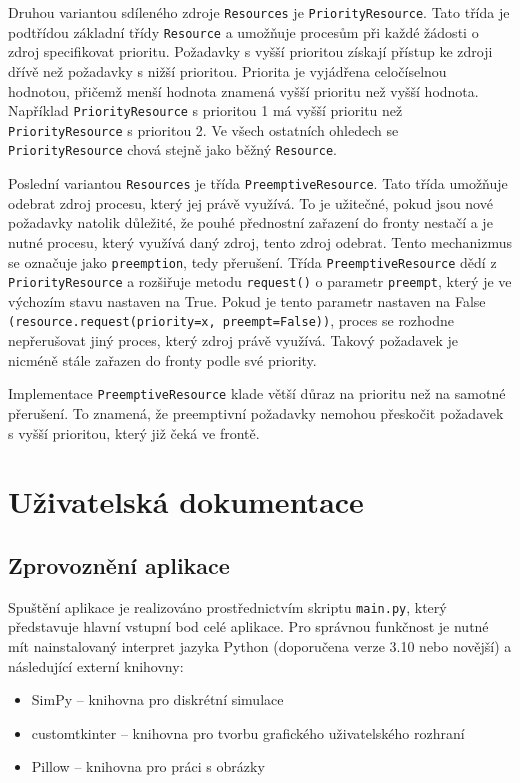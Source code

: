 \documentclass[12pt,a4paper]{article}
\begin{document}
Druhou variantou sdíleného zdroje \texttt{Resources} je \texttt{PriorityResource}. Tato třída je podtřídou základní třídy \texttt{Resource} a umožňuje procesům při každé žádosti o zdroj specifikovat prioritu. Požadavky s vyšší prioritou získají přístup ke zdroji dřívě než požadavky s nižší prioritou. Priorita je vyjádřena celočíselnou hodnotou, přičemž menší hodnota znamená vyšší prioritu než vyšší hodnota. Například \texttt{PriorityResource} s prioritou 1 má vyšší prioritu než \texttt{PriorityResource} s prioritou 2. Ve všech ostatních ohledech se \texttt{PriorityResource} chová stejně jako běžný \texttt{Resource}.

Poslední variantou \texttt{Resources} je třída \texttt{PreemptiveResource}. Tato třída umožňuje odebrat zdroj procesu, který jej právě využívá. To je užitečné, pokud jsou nové požadavky natolik důležité, že pouhé přednostní zařazení do fronty nestačí a je nutné procesu, který využívá daný zdroj, tento zdroj odebrat. Tento mechanizmus se označuje jako \texttt{preemption}, tedy přerušení. Třída \texttt{PreemptiveResource} dědí z \texttt{PriorityResource} a rozšiřuje metodu \texttt{request()} o parametr \texttt{preempt}, který je ve výchozím stavu nastaven na True. Pokud je tento parametr nastaven na False \texttt{(resource.request(priority=x, preempt=False))}, proces se rozhodne nepřerušovat jiný proces, který zdroj právě využívá. Takový požadavek je nicméně stále zařazen do fronty podle své priority.

Implementace \texttt{PreemptiveResource} klade větší důraz na prioritu než na samotné přerušení. To znamená, že preemptivní požadavky nemohou přeskočit požadavek s vyšší prioritou, který již čeká ve frontě. 

\section{Uživatelská dokumentace}
\subsection{Zprovoznění aplikace}

Spuštění aplikace je realizováno prostřednictvím skriptu \texttt{main.py}, který představuje hlavní vstupní bod celé aplikace. Pro správnou funkčnost je nutné mít nainstalovaný interpret jazyka Python (doporučena verze 3.10 nebo novější) a následující externí knihovny:

\begin{itemize}
    \item SimPy – knihovna pro diskrétní simulace
    \item customtkinter – knihovna pro tvorbu grafického uživatelského rozhraní
    \item Pillow – knihovna pro práci s obrázky
\end{itemize}
\end{document}
